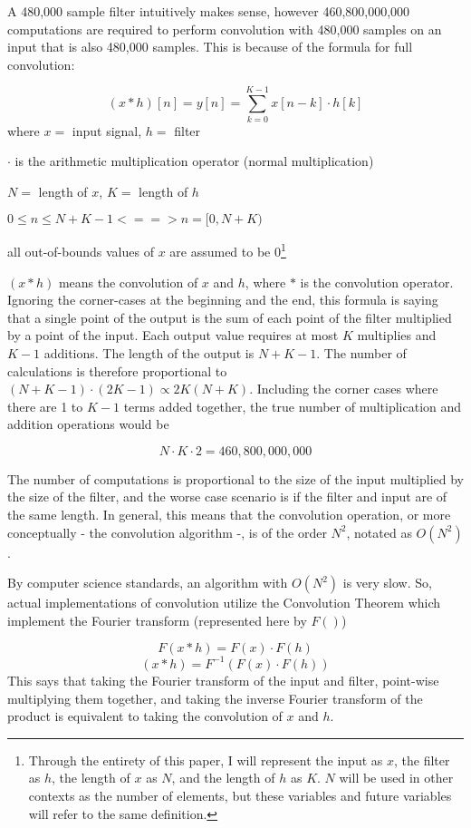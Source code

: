 A 480,000 sample filter intuitively makes sense, however 460,800,000,000 computations are required to perform convolution with 480,000 samples on an input that is also 480,000 samples. This is because of the formula for full convolution:
\begin{center}
$$(x * h)[n] = y[n] = \sum_{k=0}^{K-1} x[n-k] \cdot h[k]$$
where $x =$ input signal, $h =$ filter

$\cdot$ is the arithmetic multiplication operator (normal multiplication)

$N =$ length of $x$, $K =$ length of $h$

$0 \leq n \le N + K - 1 <==> n = [0, N + K)$

all out-of-bounds values of $x$ are assumed to be 0\footnote{Through the entirety of this paper, I will represent the input as $x$, the filter as $h$, the length of $x$ as $N$, and the length of $h$ as $K$. $N$ will be used in other contexts as the number of elements, but these variables and future variables will refer to the same definition.}

\end{center}
\noindent $(x * h)$ means the convolution of $x$ and $h$, where $*$ is the convolution operator. Ignoring the corner-cases at the beginning and the end, this formula is saying that a single point of the output is the sum of each point of the filter multiplied by a point of the input. Each output value requires at most $K$ multiplies and $K - 1$ additions. The length of the output is $N + K - 1$. The number of calculations is therefore proportional to $(N + K - 1) \cdot (2K - 1) \propto 2K(N + K)$. Including the corner cases where there are 1 to $K - 1$ terms added together, the true number of multiplication and addition operations would be 

$$N \cdot K \cdot 2 = 460,800,000,000$$ 

The number of computations is proportional to the size of the input multiplied by the size of the filter, and the worse case scenario is if the filter and input are of the same length. In general, this means that the convolution operation, or more conceptually - the convolution algorithm -, is of the order $N^2$, notated as $O(N^2)$. 

By computer science standards, an algorithm with $O(N^2)$ is very slow. So, actual implementations of convolution utilize the Convolution Theorem which implement the Fourier transform (represented here by $F()$)

$$F(x * h)  = F(x) \cdot F(h)$$
$$(x * h) = F^{-1}(F(x) \cdot F(h))$$
This says that taking the Fourier transform of the input and filter, point-wise multiplying them together, and taking the inverse Fourier transform of the product is equivalent to taking the convolution of $x$ and $h$.

